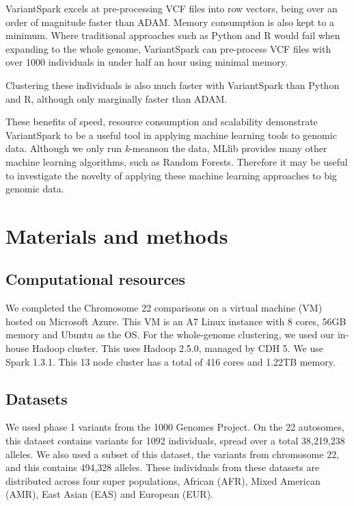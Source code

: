 \documentclass{bmcart}
\newcommand{\variantSpark}{{\sc VariantSpark}}
\newcommand{\kMeans}{\textit{k}-means}
\begin{document}
\variantSpark{} excels at pre-processing VCF files into row vectors, being over an order of magnitude faster than ADAM. Memory consumption is also kept to a minimum. Where traditional approaches such as Python and R would fail when expanding to the whole genome,
\variantSpark{} can pre-process VCF files with over 1000 individuals in under half an hour using minimal memory.

Clustering these individuals is also much faster with \variantSpark{} than Python and R, although only marginally faster than ADAM.

These benefits of speed, resource consumption and scalability demonstrate \variantSpark{} to be a useful tool in applying machine learning tools to genomic data. Although we only run \kMeans on the data, MLlib provides many other machine learning algorithms, such as Random Forests.
Therefore it may be useful to investigate the novelty of applying these machine learning approaches to big genomic data.  





\section*{Materials and methods}
\subsection*{Computational resources}
We completed the Chromosome 22 comparisons on a virtual machine (VM) hosted on Microsoft Azure. This VM is an A7 Linux instance with 8 cores, 56GB memory and Ubuntu as the OS. 
For the whole-genome clustering, we used our in-house Hadoop cluster. This uses Hadoop 2.5.0, managed by CDH 5. We use Spark 1.3.1. This 13 node cluster has a total of 416 cores and 1.22TB memory.


\subsection*{Datasets}
We used  phase 1 variants from the 1000 Genomes Project. On the 22 autosomes, this dataset contains variants for 1092 individuals, spread over a total 38,219,238 alleles.
We also used a subset of this dataset, the variants from chromosome 22, and this contains 494,328 alleles.
These individuals from these datasets are distributed across four super populations, African (AFR), Mixed American (AMR), East Asian (EAS) and European (EUR).
\end{document}
